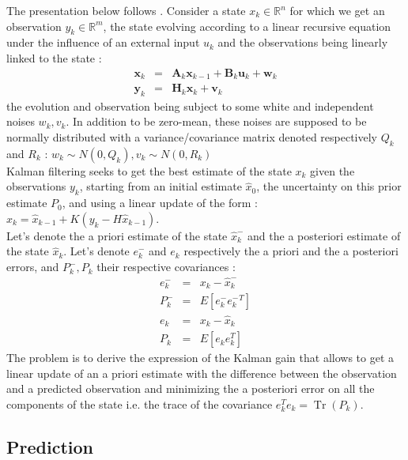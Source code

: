 \documentclass[10pt,oneside]{scrartcl}
\newcommand\vecteur[1]{\boldsymbol#1}
\newcommand\matrice[1]{\mathbf#1}
\newcommand\trace{\operatorname*{Tr}}
\begin{document}
The presentation below follows \cite{Welch2006}. Consider a state $x_k
\in \mathbb{R}^n$ for which we get an observation $y_k \in
\mathbb{R}^m$, the state evolving according to a linear recursive
equation under the influence of an external input $u_k$ and the observations being linearly linked to the state :
\begin{eqnarray}
\vecteur{x_k} &=& \matrice{A}_k \vecteur{x}_{k-1} + \matrice{B}_k
\vecteur{u}_k + \vecteur{w}_{k}\\
\label{kalman_state_space} \vecteur{y_k} &=& \matrice{H}_k \vecteur{x_k} + \vecteur{v_k}
\end{eqnarray}
the evolution and observation being subject to some white and independent noises $w_k,v_k$. In addition to be zero-mean, these noises are supposed to be normally distributed with a variance/covariance matrix denoted respectively $Q_k$ and $R_k$ : $w_k\sim N(0,Q_k), v_k \sim N(0,R_k)$\\

Kalman filtering seeks to get the best estimate of the state $x_k$ given the observations $y_k$, starting from an initial estimate $\hat{x}_0$, the uncertainty on this prior estimate $P_0$, and using a linear update of the form : $\hat{x}_k = \hat{x}_{k-1} + K (y_k - H \hat{x}_{k-1})$.\\

Let's denote the a priori estimate of the state $\hat{x}^-_k$ and the a posteriori estimate of the state $\hat{x}_k$. Let's denote $e^-_k$ and $e_k$ respectively the a priori and the a posteriori errors, and $P_k^-,P_k$ their respective covariances :
\begin{eqnarray}
\nonumber e^-_k &=& x_k - \hat{x}^-_k\\
\nonumber P_k^- &=& E[e^-_k {e^-_k}^T]\\
\nonumber e_k &=& x_k - \hat{x}_k\\
\label{eq_kalman_posterior_error} P_k &=& E[e_k e_k^T] %
\end{eqnarray}
The problem is to derive the expression of the Kalman gain that allows to get a linear update of an a priori estimate with the difference between the observation and a predicted observation and minimizing the a posteriori error on all the components of the state i.e. the trace of the covariance $e_k^T e_k = \trace(P_k)$. 


\subsection{Prediction}
\end{document}
